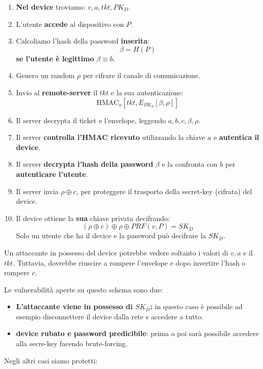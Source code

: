 \begin{definition}\label{def:keyretr}
\begin{enumerate}
    \item \textbf{Nel device} troviamo: $v,a,tkt,PK_D$.
    \item L'utente \textbf{accede} al dispositivo con $P$.
    \item Calcoliamo l'hash della password \textbf{inserita}:\[\beta=H(P)\]
    \textbf{se l'utente è legittimo} $\beta\equiv b$.
    \item Genero un random $\rho$ per cifrare il canale di comunicazione.
    \item Invio al \textbf{remote-server} il $tkt$ e la sua autenticazione:
    \[\text{HMAC}_a[tkt, E_{PK_S}[\beta,\rho]]\]
    \item Il server decrypta il ticket e l'envelope, leggendo $a,b,c,\beta,\rho$.
    \item Il server \textbf{controlla l'HMAC ricevuto} utilizzando la chiave $a$ e \textbf{autentica il device}.
    \item Il server \textbf{decrypta l'hash della password} $\beta$ e la confronta con $b$ per \textbf{autenticare l'utente}.
    \item Il server invia $\rho\oplus c$, per proteggere il trasporto della secret-key (cifrata) del device.
    \item Il device ottiene la \textbf{sua} chiave privata decifrando:
    \[(\rho \oplus c)\oplus \rho \oplus PRF(v,P)=SK_D\]
    Solo un utente che ha il device e la password può decifrare la $SK_D$.
    \end{enumerate}
\end{definition}
\begin{remark}
Un attaccante in possesso del device potrebbe vedere soltanto i valori di $v,a$ e il $tkt$. Tuttavia, dovrebbe riuscire a rompere l'envelope e dopo invertire l'hash o rompere $c$.
\end{remark}
Le vulnerabilità aperte su questo schema sono due:
\begin{itemize}
    \item \textbf{L'attaccante viene in possesso di $SK_D$:} in questo caso è possibile ad esempio disconnettere il device dalla rete e accedere a tutto.
    \item \textbf{device rubato e password predicibile}: prima o poi sarà possibile accedere alla secre-key facendo brute-forcing.
\end{itemize}
Negli altri casi siamo protetti:
